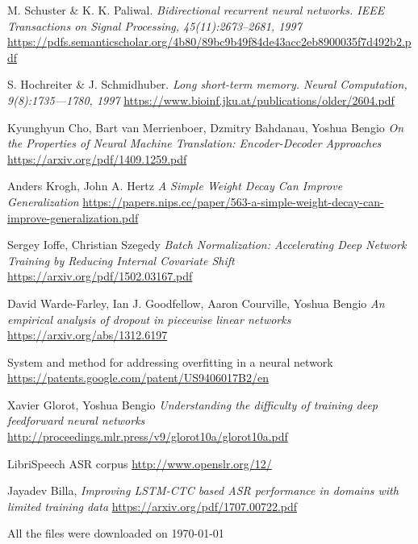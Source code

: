 \documentclass[licencjacka,en]{pracamgr}
\newcommand{\bibDownloadDate}{\today}
\begin{document}
\begin{thebibliography}{99}
 M. Schuster \& K. K. Paliwal. \textit{Bidirectional recurrent neural networks. IEEE Transactions on Signal Processing, 45(11):2673–2681, 1997} \href{https://pdfs.semanticscholar.org/4b80/89bc9b49f84de43acc2eb8900035f7d492b2.pdf}{https://pdfs.semanticscholar.org/4b80/89bc9b49f84de43acc2eb8900035f7d492b2.pdf}

 S. Hochreiter \& J. Schmidhuber. \textit{Long short-term memory. Neural Computation, 9(8):1735—1780, 1997} \href{https://www.bioinf.jku.at/publications/older/2604.pdf}{https://www.bioinf.jku.at/publications/older/2604.pdf}

 Kyunghyun Cho, Bart van Merrienboer, Dzmitry Bahdanau, Yoshua Bengio \textit{On the Properties of Neural Machine Translation: Encoder-Decoder Approaches} \href{https://arxiv.org/pdf/1409.1259.pdf}{https://arxiv.org/pdf/1409.1259.pdf}

 Anders Krogh, John A. Hertz \textit{A Simple Weight Decay Can Improve Generalization} \href{https://papers.nips.cc/paper/563-a-simple-weight-decay-can-improve-generalization.pdf}{https://papers.nips.cc/paper/563-a-simple-weight-decay-can-improve-generalization.pdf}

 Sergey Ioffe, Christian Szegedy \textit{Batch Normalization: Accelerating Deep Network Training by Reducing Internal Covariate Shift} \href{https://arxiv.org/pdf/1502.03167.pdf}{https://arxiv.org/pdf/1502.03167.pdf}

 David Warde-Farley, Ian J. Goodfellow, Aaron Courville, Yoshua Bengio \textit{An empirical analysis of dropout in piecewise linear networks
} \href{https://arxiv.org/abs/1312.6197}{https://arxiv.org/abs/1312.6197}

 System and method for addressing overfitting in a neural network \href{https://patents.google.com/patent/US9406017B2/en}{https://patents.google.com/patent/US9406017B2/en}

 Xavier Glorot, Yoshua Bengio \textit{Understanding the difficulty of training deep feedforward neural networks} \href{http://proceedings.mlr.press/v9/glorot10a/glorot10a.pdf}{http://proceedings.mlr.press/v9/glorot10a/glorot10a.pdf}

 LibriSpeech ASR corpus \href{http://www.openslr.org/12/}{http://www.openslr.org/12/}

 Jayadev Billa, \textit{Improving LSTM-CTC based ASR performance in
domains with limited training data}
\href{https://arxiv.org/pdf/1707.00722.pdf}{https://arxiv.org/pdf/1707.00722.pdf}

\end{thebibliography}
All the files were downloaded on \bibDownloadDate
\end{document}
